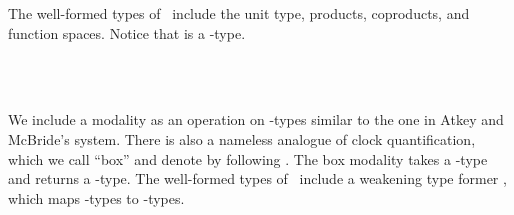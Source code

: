 The well-formed types of \GTT\ include the unit type,
products, coproducts, and function spaces. Notice that  is a
-type.
\begin{AgdaAlign}
\begin{code}%
\>[0][@{}l@{\AgdaIndent{1}}]%
\>[2]\AgdaSpace{}%
\AgdaSpace{}%
\AgdaSymbol{:}\AgdaSpace{}%
\AgdaSpace{}%
\AgdaSpace{}%
\AgdaSpace{}%
\<%
\\
\>[2][@{}l@{\AgdaIndent{0}}]%
\>[4]\AgdaSpace{}%
\AgdaSymbol{:}\AgdaSpace{}%
\AgdaSpace{}%
\<%
\\
%
\>[4]\AgdaSpace{}%
\AgdaSpace{}%
\AgdaSpace{}%
\AgdaSymbol{:}\AgdaSpace{}%
\AgdaSpace{}%
\AgdaSymbol{\{}\AgdaSymbol{\}}\AgdaSpace{}%
\AgdaSpace{}%
\AgdaSpace{}%
\AgdaSpace{}%
\AgdaSpace{}%
\AgdaSpace{}%
\AgdaSpace{}%
\AgdaSpace{}%
\AgdaSpace{}%
\<%
\end{code}

We include a modality  as an operation on -types similar to the one in Atkey and McBride's system.
There is also a nameless analogue of clock quantification, which we call ``box'' and denote by 
following \cite{CloustonBGB15}. The box modality takes a
-type and returns a -type. The well-formed types of \GTT\
include a weakening type former , which maps -types to
\IC{κ}-types.
\begin{code}%
%
\>[4]\AgdaSpace{}%
\AgdaSymbol{:}\AgdaSpace{}%
\AgdaSpace{}%
\AgdaSpace{}%
\AgdaSpace{}%
\AgdaSpace{}%
\<%
\\
%
\>[4]\AgdaSpace{}%
\AgdaSymbol{:}\AgdaSpace{}%
\AgdaSpace{}%
\AgdaSpace{}%
\AgdaSpace{}%
\AgdaSpace{}%
\<%
\\
%
\>[4]\AgdaSpace{}%
\AgdaSymbol{:}\AgdaSpace{}%
\AgdaSpace{}%
\AgdaSpace{}%
\AgdaSpace{}%
\AgdaSpace{}%
\<%
\end{code}


\end{AgdaAlign}
